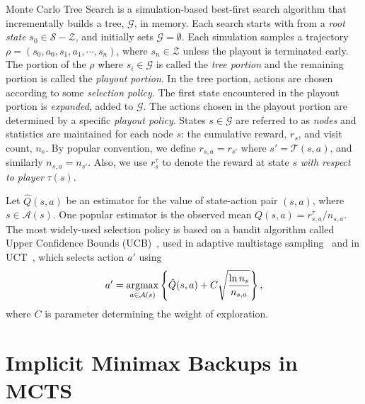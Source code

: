 \documentclass[conference]{IEEEtran}
\newcommand{\argmax}{\operatornamewithlimits{argmax}}
\newcommand{\cA}{\mathcal{A}}
\newcommand{\cG}{\mathcal{G}}
\newcommand{\cS}{\mathcal{S}}
\newcommand{\cT}{\mathcal{T}}
\newcommand{\cZ}{\mathcal{Z}}
\newcommand{\hQ}{\hat{Q}}
\begin{document}
Monte Carlo Tree Search is a simulation-based best-first search algorithm that incrementally builds a tree, $\cG$, 
in memory. 
Each search starts with from a {\it root state} $s_0 \in \cS - \cZ$, and initially sets $\cG = \emptyset$. 
Each simulation samples a trajectory $\rho = (s_0, a_0, s_1, a_1, \cdots, s_n)$, where $s_n \in \cZ$ unless the playout 
is terminated early. 
The portion of the $\rho$ where $s_i \in \cG$ is called the {\it tree portion} and the remaining portion is
called the {\it playout portion}. In the tree portion, actions are chosen according to some {\it selection policy}. 
The first state encountered in the playout portion is {\it expanded}, added to $\cG$.
The actions chosen in the playout portion are determined by a specific {\it playout policy}. 
States $s \in \cG$ are referred to as {\it nodes} and statistics are  
maintained for each node $s$: the cumulative reward, $r_s$, and visit count, $n_s$. 
By popular convention, we define $r_{s,a} = r_{s'}$ where $s' = \cT(s,a)$, and similarly $n_{s,a} = n_{s'}$. 
Also, we use $r^{\tau}_s$ to denote the reward at state $s$ {\it with respect to player} $\tau(s)$. 

Let $\hQ(s,a)$ be an estimator for the value of state-action pair $(s,a)$, where $s \in \cA(s)$. 
One popular estimator is the observed mean 
$Q(s,a) = r^{\tau}_{s,a} / n_{s,a}$. 
The most widely-used selection policy is based on a bandit algorithm called Upper Confidence Bounds 
(UCB)~\cite{Auer02Finite}, used in adaptive multistage sampling~\cite{Chang2005AMS} and in 
UCT~\cite{Kocsis06Bandit}, which selects action $a'$ using
\begin{equation}
\label{eq:select-ucb}
a' = \argmax_{a \in \cA(s)} \left\{ \hQ(s,a) + C \sqrt{\frac{\ln n_s}{n_{s,a}}} \right\}, 
\end{equation}
where $C$ is parameter determining the weight of exploration. 

\section{Implicit Minimax Backups in MCTS}
\end{document}
